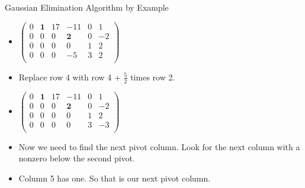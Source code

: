 \documentclass{beamer}
\begin{document}
\begin{frame}{Gaussian Elimination Algorithm by Example}

\begin{itemize}
\item $
\begin{pmatrix}
0 & \textbf{1} &  17   &          -11   &  0  &  1  \\
0 &         0  &   0   &   \textbf{2}   &  0  &  -2 \\
0 &         0  &   0   &           0    &  1  &  2 \\
0 &         0  &   0   &          -5    &  3  &  2 \\
\end{pmatrix}
$
\item Replace row 4 with row 4 + $\frac{5}{2}$ times row 2.
\item $
\begin{pmatrix}
0 & \textbf{1} &  17   &          -11   &  0  &   1  \\
0 &         0  &   0   &   \textbf{2}   &  0  &  -2  \\
0 &         0  &   0   &           0    &  1  &   2  \\
0 &         0  &   0   &           0    &  3  &   -3  \\
\end{pmatrix}
$
\item Now we need to find the next pivot column. Look for the
next column with a nonzero below the second pivot.
\item Column 5 has one. So that is our next pivot column.
\end{itemize}
\end{frame}

\end{document}
